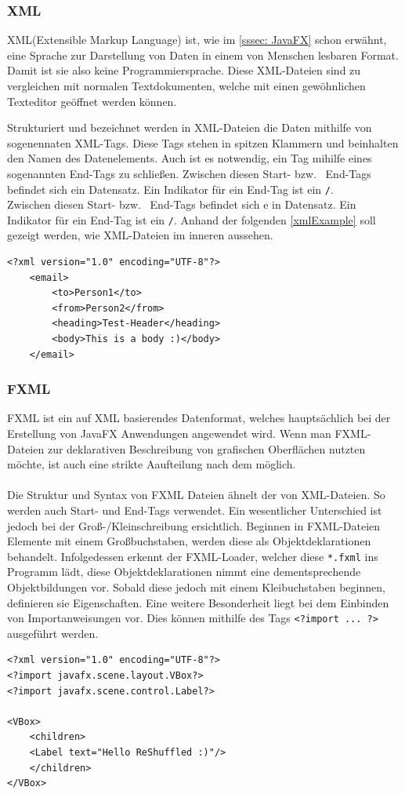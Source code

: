\subsubsection{XML}
XML(Extensible Markup Language) ist, wie im \autoref{sssec: JavaFX} schon erwähnt, eine Sprache zur Darstellung von Daten in einem von Menschen lesbaren Format.
Damit ist sie also keine Programmiersprache.
Diese XML-Dateien sind zu vergleichen mit normalen Textdokumenten, welche mit einen gewöhnlichen Texteditor geöffnet werden können.

Strukturiert und bezeichnet werden in XML-Dateien die Daten mithilfe von sogenennaten XML-Tags.
Diese Tags stehen in spitzen Klammern und beinhalten den Namen des Datenelements.
Auch ist es notwendig, ein Tag mihilfe eines sogenannten End-Tags zu schließen.
Zwischen diesen Start- bzw. \ End-Tags befindet sich ein Datensatz.
Ein Indikator für ein End-Tag ist ein \lstinline{/}.\\
Zwischen diesen Start- bzw. \ End-Tags befindet sich e
in Datensatz.
Ein Indikator für ein End-Tag ist ein \lstinline{/}.
Anhand der folgenden \autoref{xmlExample} soll gezeigt werden, wie XML-Dateien im inneren aussehen.
\begin{lstlisting}[style=XML,caption=XML-Codebeispiel,label=xmlExample]
<?xml version="1.0" encoding="UTF-8"?>
    <email>
        <to>Person1</to>
        <from>Person2</from>
        <heading>Test-Header</heading>
        <body>This is a body :)</body>
    </email>
\end{lstlisting}
\subsubsection{FXML}
FXML ist ein auf XML basierendes Datenformat, welches hauptsächlich bei der Erstellung von JavaFX Anwendungen angewendet wird.
Wenn man FXML-Dateien zur deklarativen Beschreibung von grafischen Oberflächen nutzten möchte, ist auch eine strikte Aaufteilung nach dem  möglich.\\\\
Die Struktur und Syntax von FXML Dateien ähnelt der von XML-Dateien.
So werden auch Start- und End-Tags verwendet.
Ein wesentlicher Unterschied ist jedoch bei der Groß-/Kleinschreibung ersichtlich.
Beginnen in FXML-Dateien Elemente mit einem Großbuchstaben, werden diese als Objektdeklarationen behandelt.
Infolgedessen erkennt der FXML-Loader, welcher diese \lstinline{*.fxml} ins Programm lädt, diese Objektdeklarationen nimmt eine dementsprechende Objektbildungen vor.
Sobald diese jedoch mit einem Kleibuchstaben beginnen, definieren sie Eigenschaften.
Eine weitere Besonderheit liegt bei dem Einbinden von Importanweisungen vor.
Dies können mithilfe des Tags \lstinline{<?import ... ?>} ausgeführt werden.\\
\begin{lstlisting}[style=XML,caption=FXML-Codebeispiel,label=fxmlExample]
<?xml version="1.0" encoding="UTF-8"?>
<?import javafx.scene.layout.VBox?>
<?import javafx.scene.control.Label?>

<VBox>
    <children>
    <Label text="Hello ReShuffled :)"/>
    </children>
</VBox>
\end{lstlisting}


